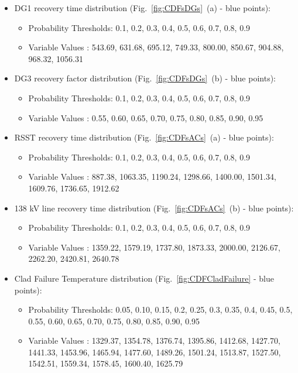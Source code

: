    \begin{itemize}
       \item DG1 recovery time distribution (Fig.~\ref{fig:CDFsDGs}~(a) - blue points): 
       \begin{itemize} 
            \item Probability Thresholds: 0.1, 0.2, 0.3, 0.4, 0.5, 0.6, 0.7, 0.8,  0.9
            \item Variable Values           : 543.69, 631.68, 695.12, 749.33, 800.00, 850.67, 904.88, 968.32, 1056.31
       \end{itemize}
       \item DG3 recovery factor distribution (Fig.~\ref{fig:CDFsDGs}~(b) - blue points): 
       \begin{itemize} 
            \item Probability Thresholds: 0.1, 0.2, 0.3, 0.4, 0.5, 0.6, 0.7, 0.8,  0.9
            \item Variable Values           : 0.55, 0.60, 0.65, 0.70, 0.75, 0.80, 0.85, 0.90, 0.95
       \end{itemize}
       \item RSST recovery time distribution (Fig.~\ref{fig:CDFsACs}~(a) - blue points): 
       \begin{itemize} 
            \item Probability Thresholds:  0.1, 0.2,  0.3,  0.4, 0.5, 0.6, 0.7,  0.8,  0.9
            \item Variable Values           :  887.38, 1063.35, 1190.24, 1298.66, 1400.00, 1501.34, 1609.76, 1736.65, 1912.62
       \end{itemize}
       \item 138 kV line recovery time distribution (Fig.~\ref{fig:CDFsACs}~(b) - blue points): 
       \begin{itemize} 
            \item Probability Thresholds: 0.1, 0.2, 0.3, 0.4, 0.5, 0.6, 0.7, 0.8, 0.9  
            \item Variable Values           : 1359.22,  1579.19,  1737.80, 1873.33,  2000.00,  2126.67, 2262.20,  2420.81, 2640.78
       \end{itemize}
       \item Clad Failure Temperature distribution (Fig.~\ref{fig:CDFCladFailure} - blue points): 
       \begin{itemize} 
            \item Probability Thresholds: 0.05, 0.10, 0.15, 0.2, 0.25, 0.3, 0.35, 0.4, 0.45, 0.5, 0.55, 0.60, 0.65, 0.70, 0.75, 0.80, 0.85, 0.90, 0.95
            \item Variable Values           : 1329.37, 1354.78, 1376.74, 1395.86, 1412.68, 1427.70, 1441.33, 1453.96, 1465.94, 1477.60, 1489.26, 1501.24, 1513.87, 1527.50, 	1542.51, 1559.34, 1578.45, 1600.40, 1625.79
    \end{itemize}
\end{itemize}
\vspace{-5mm}

